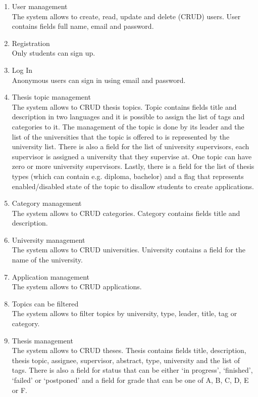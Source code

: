 \begin{enumerate}
    \item User management\\
    The system allows to create, read, update and delete (CRUD) users. User contains fields full name, email and password.

    \item Registration\\
    Only students can sign up.

    \item Log In\\
    Anonymous users can sign in using email and password.

    \item Thesis topic management\\
    The system allows to CRUD thesis topics. Topic contains fields title and description in two languages and it is possible to assign the list of tags and categories to it. The management of the topic is done by its leader and the list of the universities that the topic is offered to is represented by the university list. There is also a field for the list of university supervisors, each supervisor is assigned a university that they supervise at. One topic can have zero or more university supervisors. Lastly, there is a field for the list of thesis types (which can contain e.g. diploma, bachelor) and a flag that represents enabled/disabled state of the topic to disallow students to create applications.

    \item Category management\\
    The system allows to CRUD categories. Category contains fields title and description.

    \item University management\\
    The system allows to CRUD universities. University contains a field for the name of the university.

    \item Application management\\
    The system allows to CRUD applications.

    \item Topics can be filtered\\
    The system allows to filter topics by university, type, leader, title, tag or category.

    \item Thesis management\\
    The system allows to CRUD theses. Thesis contains fields title, description, thesis topic, assignee, supervisor, abstract, type, university and the list of tags. There is also a field for status that can be either `in progress', `finished', `failed' or `postponed' and a field for grade that can be one of A, B, C, D, E or F.


\end{enumerate}
